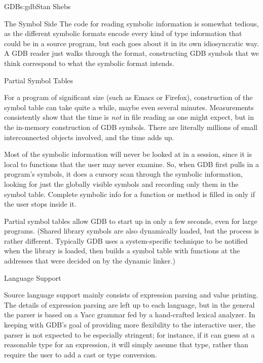 \begin{aosachapter}{GDB}{s:gdb}{Stan Shebs}
\begin{aosasect1}{The Symbol Side}
The code for reading symbolic information is somewhat tedious, as the
different symbolic formats encode every kind of type information that
could be in a source program, but each goes about it in its own
idiosyncratic way.  A GDB reader just walks through the format,
constructing GDB symbols that we think correspond to what the symbolic
format intends.

\end{aosasect1}

\begin{aosasect2}{Partial Symbol Tables}

For a program of significant size (such as Emacs or Firefox),
construction of the symbol table can take quite a while, maybe even
several minutes.  Measurements consistently show that the time is
{\em not} in file reading as one might expect, but in the in-memory
construction of GDB symbols. There are literally millions of small
interconnected objects involved, and the time adds up.

Most of the symbolic information will never be looked at in a session,
since it is local to functions that the user may never examine.  So,
when GDB first pulls in a program's symbols, it does a cursory scan
through the symbolic information, looking for just the
globally visible symbols and recording only them in the symbol table.
Complete symbolic info for a function or method is filled in only if
the user stops inside it.

Partial symbol tables allow GDB to start up in only a few seconds, even
for large programs. (Shared library symbols are also dynamically loaded, but the process
is rather different.  Typically GDB uses a system-specific technique
to be notified when the library is loaded, then builds a symbol
table with functions at the addresses that were decided on by the
dynamic linker.)

\end{aosasect2}

\begin{aosasect2}{Language Support}

Source language support mainly consists of expression parsing and value 
printing.  The details of expression parsing are left up to each language, 
but in
the general the parser is based on a Yacc grammar fed by a
hand-crafted lexical analyzer.  In keeping with GDB's goal of providing
more flexibility to the interactive user, the parser is not expected
to be especially stringent; for instance, if it can guess at a
reasonable type for an expression, it will simply assume that type,
rather than require the user to add a cast or type conversion.


\end{aosasect2}
\end{aosachapter}

